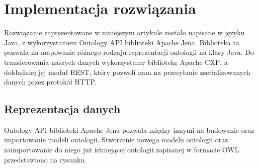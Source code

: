 \section{Implementacja rozwiązania}
\label{cha:impl}

Rozwiązanie zaprezentowane w niniejszym artykule zostało napisane w języku Java, z wykorzystaniem Ontology API biblioteki Apache Jena. Biblioteka ta pozwala na mapowanie różnego rodzaju reprezentacji ontologii na klasy Java. Do transferowania naszych danych wykorzystamy bibliotekę Apache CXF, a dokładniej jej moduł REST, który pozwoli nam na przesyłanie zserializowanych danych przez protokół HTTP.

\subsection{Reprezentacja danych}
\label{sec:persist}

Ontology API biblioteki Apache Jena pozwala między innymi na budowanie oraz importowanie modeli ontologii. Stworzenie nowego modelu ontologii oraz zaimportowanie do niego już istniejącej ontologii zapisanej w formacie OWL przedstawiono na rysunku.

